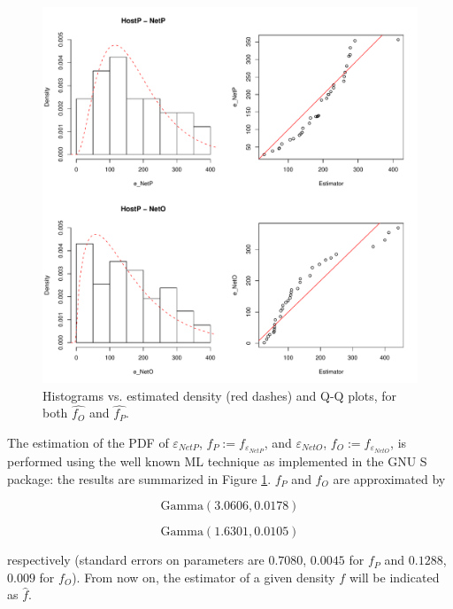 \begin{figure}[t]
  \centering
  \includegraphics[width=\textwidth]{figures/correlation/causality/hist_qqplot}
  \caption{Histograms vs. estimated density (red dashes) and Q-Q
    plots, for both $\hat{f_{O}}$ and $\hat{f_{P}}$.}
  \label{fig:hist_qqplot}
\end{figure}

The estimation of the \ac{PDF} of $\varepsilon_{NetP}$,
$f_{P} := f_{\varepsilon_{NetP}}$, and $\varepsilon_{NetO}$, $f_{O} :=
f_{\varepsilon_{NetO}}$, is performed using the well known \ac{ML}
technique \citep{venables2002mas} as implemented in the \textsf{GNU S}
package: the results are summarized in Figure
\ref{fig:hist_qqplot}. $f_{P}$ and $f_{O}$ are approximated by

\begin{displaymath}
  \mathrm{Gamma}(3.0606, 0.0178)
\end{displaymath}

\begin{displaymath}
  \mathrm{Gamma}(1.6301, 0.0105)
\end{displaymath}


\noindent respectively (standard errors on parameters are $0.7080$, $0.0045$ for $f_{P}$ and $0.1288$, $0.009$ for $f_{O}$). From now on, the estimator of a given density $f$ will be indicated as $\hat{f}$.

